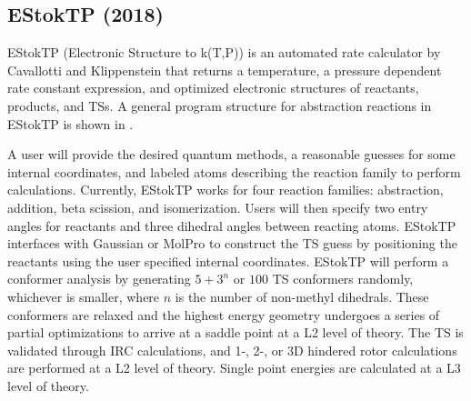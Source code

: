 \documentclass[preprint, 11pt]{elsarticle} %
\begin{document}


\subsection{EStokTP (2018)}


EStokTP (Electronic Structure to k(T,P)) \cite{Cavallotti:2019jctc} is an automated rate calculator by Cavallotti and Klippenstein that returns a temperature, a pressure dependent rate constant expression, and optimized electronic structures of reactants, products, and TSs.
A general program structure for abstraction reactions in EStokTP is shown in .

A user will provide the desired quantum methods, a reasonable guesses for some internal coordinates, and labeled atoms describing the reaction family to perform calculations.
Currently, EStokTP works for four reaction families: abstraction, addition, beta scission, and isomerization. 
Users will then specify two entry angles for reactants and three dihedral angles between reacting atoms.
EStokTP interfaces with Gaussian \cite{Gaussian:2009} or MolPro \cite{molpro:2012} to construct the TS guess by positioning the reactants using the user specified internal coordinates. 
EStokTP will perform a conformer analysis by generating $5 + 3^n$ or $100$ TS conformers randomly, whichever is smaller, where $n$ is the number of non-methyl dihedrals. 
These conformers are relaxed and the highest energy geometry undergoes a series of partial optimizations to arrive at a saddle point at a L2 level of theory. 
The TS is validated through IRC calculations, and 1-, 2-, or 3D hindered rotor calculations are performed at a L2 level of theory.
Single point energies are calculated at a L3 level of theory.
\end{document}
